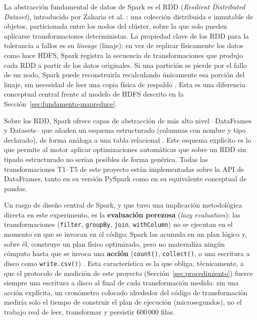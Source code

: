 \documentclass[11pt,a4paper]{article}
\begin{document}
La abstracci\'on fundamental de datos de Spark es el RDD (\emph{Resilient
Distributed Dataset}), introducido por Zaharia et al. \cite{zaharia2012}: una
colecci\'on distribuida e inmutable de objetos, particionada entre los nodos
del cl\'uster, sobre la que solo pueden aplicarse transformaciones
deterministas. La propiedad clave de los RDD para la tolerancia a fallos es
su \emph{lineage} (linaje): en vez de replicar f\'isicamente los datos como
hace HDFS, Spark registra la secuencia de transformaciones que produjo cada
RDD a partir de los datos originales. Si una partici\'on se pierde por el
fallo de un nodo, Spark puede reconstruirla recalculando \'unicamente esa
porci\'on del linaje, sin necesidad de leer una copia f\'isica de respaldo
\cite{zaharia2012}. Esta es una diferencia conceptual central frente al
modelo de HDFS descrito en la Secci\'on~\ref{sec:fundamento-mapreduce}.

Sobre los RDD, Spark ofrece capas de abstracci\'on de m\'as alto nivel
--DataFrames y Datasets-- que a\~naden un esquema estructurado (columnas con
nombre y tipo declarado), de forma an\'aloga a una tabla relacional
\cite{zaharia2016,chambers2018}. Este esquema expl\'icito es lo que permite
al motor aplicar optimizaciones autom\'aticas que sobre un RDD sin tipado
estructurado no ser\'ian posibles de forma gen\'erica. Todas las
transformaciones T1--T5 de este proyecto est\'an implementadas sobre la API
de DataFrames, tanto en su versi\'on PySpark como en su equivalente
conceptual de pandas.

Un rasgo de dise\~no central de Spark, y que tuvo una implicaci\'on
metodol\'ogica directa en este experimento, es la \textbf{evaluaci\'on
perezosa} (\emph{lazy evaluation}): las transformaciones (\texttt{filter},
\texttt{groupBy}, \texttt{join}, \texttt{withColumn}) no se ejecutan en el
momento en que se invocan en el c\'odigo; Spark las acumula en un plan
l\'ogico y, sobre \'el, construye un plan f\'isico optimizado, pero no
materializa ning\'un c\'omputo hasta que se invoca una \textbf{acci\'on}
(\texttt{count()}, \texttt{collect()}, o una escritura a disco como
\texttt{write.csv()}) \cite{zaharia2016,chambers2018}. Esta caracter\'istica
es la que obliga, t\'ecnicamente, a que el protocolo de medici\'on de este
proyecto (Secci\'on~\ref{sec:procedimiento}) fuerce siempre una escritura a
disco al final de cada transformaci\'on medida: sin una acci\'on expl\'icita,
un cron\'ometro colocado alrededor del c\'odigo de transformaci\'on
medir\'ia solo el tiempo de construir el plan de ejecuci\'on (microsegundos),
no el trabajo real de leer, transformar y persistir 600\,000 filas.
\end{document}

